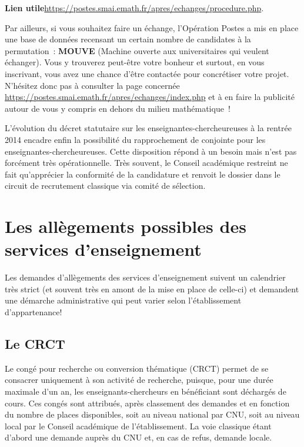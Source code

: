 \textbf{Lien utile\hspace{.5em}}\url{https://postes.smai.emath.fr/apres/echanges/procedure.php}.

Par ailleurs, si vous souhaitez faire un \'echange, l'Op\'eration
Postes a mis en place une base de donn\'ees recensant un certain
nombre de candidat\mp e\mp s \`a la permutation~: \textbf{MOUVE} (Machine
ouverte aux universitaires qui veulent \'echanger). Vous y trouverez
peut-\^etre votre bonheur et surtout, en vous inscrivant, vous avez
une chance d'\^etre contact\'e\mp e pour concr\'etiser votre projet.
N'h\'esitez donc pas \`a consulter la page concern\'ee
\url{https://postes.smai.emath.fr/apres/echanges/index.php}
et \`a en faire la publicit\'e autour de vous
y compris en dehors du milieu math\'ematique~!

L'\'evolution du d\'ecret statutaire sur les enseignant\mp e\mp s-chercheur\mp euse\mp s \`a la rentr\'ee 2014 
encadre enfin la possibilit\'e du rapprochement de conjoint\mp e pour les enseignant\mp e\mp s-chercheur\mp euse\mp s. 
Cette disposition r\'epond \`a un besoin mais n'est pas forc\'ement tr\`es op\'erationnelle. 
Tr\`es souvent, le Conseil acad\'emique restreint ne
fait qu'appr\'ecier la conformit\'e de la candidature et renvoit le dossier dans le circuit de recrutement classique via comit\'e de s\'election.


\section{Les all\`egements possibles des services d'enseignement}

Les demandes d'all\`egements des services d'enseignement suivent un calendrier tr\`es strict
(et souvent tr\`es en amont de la mise en place de celle-ci)
et demandent une d\'emarche administrative qui peut varier selon l'\'etablissement d'appartenance!

\subsection{Le CRCT}
\label{CRCT}


Le cong\'e pour recherche ou conversion th\'ematique (CRCT) permet
de se consacrer uniquement \`a son activit\'e de recherche, puisque,
pour une dur\'ee maximale d'un an, les enseignants-chercheurs en
b\'en\'eficiant sont d\'echarg\'es de cours. Ces cong\'es sont
attribu\'es, apr\`es classement des demandes et en fonction du nombre
de places disponibles, soit au niveau national par CNU, soit  au niveau local par le Conseil
acad\'emique de l'\'etablissement. La voie classique \'etant d'abord une demande
aupr\`es du CNU et, en cas de refus, demande locale.

